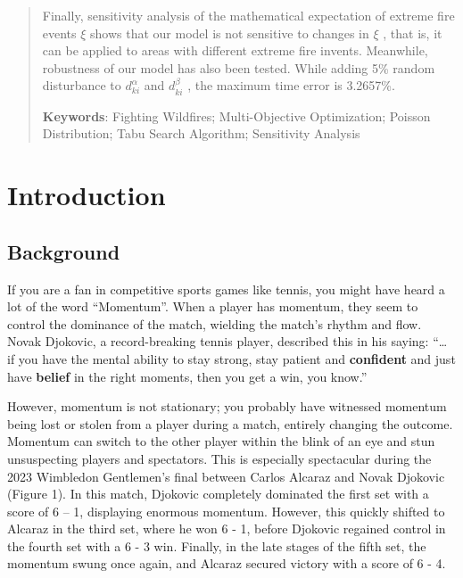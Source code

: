 \documentclass[12pt]{article}  %
\begin{document}
\begin{abstract}
Finally, sensitivity analysis of the mathematical expectation of extreme fire events $\xi$ shows that our model is not sensitive to changes in $\xi$ , that is, it can be applied to areas with different extreme fire invents. Meanwhile, robustness of our model has also been tested. While adding 5\% random disturbance to $d_{k i}^{\alpha}$  and $d_{k i}^{\beta}$ , the maximum time error is 3.2657\%. 

\vspace{5pt}  %
\textbf{Keywords}: Fighting Wildfires; Multi-Objective Optimization; Poisson Distribution; Tabu Search Algorithm; Sensitivity Analysis

\end{abstract}

\maketitle  %



\tableofcontents  




\section{Introduction}

\subsection{Background}
If you are a fan in competitive sports games like tennis, you might have heard a lot of the word “Momentum”. When a player has momentum, they seem to control the dominance of the match, wielding the match's rhythm and flow. Novak Djokovic, a record-breaking tennis player, described this in his saying: “… if you have the mental ability to stay strong, stay patient and \textbf{confident} and just have \textbf{belief} in the right moments, then you get a win, you know.”

However, momentum is not stationary; you probably have witnessed momentum being lost or stolen from a player during a match, entirely changing the outcome. Momentum can switch to the other player within the blink of an eye and stun unsuspecting players and spectators. This is especially spectacular during the 2023 Wimbledon Gentlemen’s final between Carlos Alcaraz and Novak Djokovic (Figure 1). In this match, Djokovic completely dominated the first set with a score of 6 – 1, displaying enormous momentum. However, this quickly shifted to Alcaraz in the third set, where he won 6 - 1, before Djokovic regained control in the fourth set with a 6 - 3 win. Finally, in the late stages of the fifth set, the momentum swung once again, and Alcaraz secured victory with a score of 6 - 4.
\end{document}
